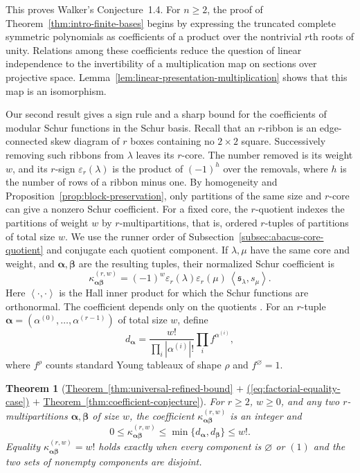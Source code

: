 \documentclass[12pt,reqno,a4paper]{amsart}
\numberwithin{equation}{section}
\numberwithin{figure}{section}
\theoremstyle{plain}
\newtheorem{mainthm}{Theorem}
\theoremstyle{definition}
\newcommand{\eps}{\varepsilon}
\newcommand{\inner}[2]{\left\langle #1,#2\right\rangle}
\begin{document}
This proves Walker's Conjecture~1.4.  For $n\geq2$, the proof of
Theorem~\ref{thm:intro-finite-bases} begins by expressing the truncated
complete symmetric polynomials as coefficients of a product over the
nontrivial $r$th roots of unity.
Relations among these coefficients reduce the question of linear independence to the
invertibility of a multiplication map on sections over projective space.
Lemma~\ref{lem:linear-presentation-multiplication} shows that this
map is an isomorphism.

Our second result gives a sign rule and a sharp bound for the
coefficients of modular Schur functions in the Schur basis.
Recall that an $r$-ribbon is an
edge-connected skew diagram of $r$ boxes containing no $2\times2$
square.  Successively removing such ribbons from $\lambda$ leaves its
$r$-core.  The number removed is its weight $w$, and its $r$-sign
$\eps_r(\lambda)$ is the product of $(-1)^{h}$ over the removals,
where $h$ is the number of rows of a ribbon minus one.
By homogeneity and Proposition~\ref{prop:block-preservation}, only
partitions of the same size and $r$-core can give a nonzero Schur
coefficient.  For a fixed core, the $r$-quotient indexes the partitions
of weight $w$ by $r$-multipartitions, that is, ordered $r$-tuples
of partitions of total size $w$.  We use the runner order
of Subsection~\ref{subsec:abacus-core-quotient} and conjugate each
quotient component.  If $\lambda,\mu$ have the same core and
weight, and $\boldsymbol\alpha,\boldsymbol\beta$ are the resulting
tuples, their normalized Schur coefficient is
\begin{equation}\label{eq:refaudit-intro-coefficients}
 \kappa^{(r,w)}_{\boldsymbol\alpha\boldsymbol\beta}
 =(-1)^w\eps_r(\lambda)\eps_r(\mu)\,
    \inner{\mathfrak s_\lambda}{s_\mu}.
\end{equation}
Here $\inner{\cdot}{\cdot}$ is the Hall inner product for which the
Schur functions are orthonormal.  The coefficient depends only on the
quotients \cite[Corollary~2.10]{Walker}.  For an $r$-tuple
$\boldsymbol\alpha=(\alpha^{(0)},\ldots,\alpha^{(r-1)})$ of total
size $w$, define
\[
 d_{\boldsymbol\alpha}
 =\frac{w!}{\prod_i|\alpha^{(i)}|!}\prod_i f^{\alpha^{(i)}},
\]
where $f^\rho$ counts standard Young tableaux of shape $\rho$ and
$f^\varnothing=1$.

\begin{mainthm}[{\hyperref[thm:universal-refined-bound]{Theorem~\ref*{thm:universal-refined-bound}}
  $+$ \hyperref[eq:factorial-equality-case]{(\ref*{eq:factorial-equality-case})}
  $+$ \hyperref[thm:coefficient-conjecture]{Theorem~\ref*{thm:coefficient-conjecture}}}]
\label{thm:intro-universal-matrices}
For $r\geq2$, $w\geq0$, and any two $r$-multipartitions
$\boldsymbol\alpha,\boldsymbol\beta$ of size $w$, the coefficient
$\kappa^{(r,w)}_{\boldsymbol\alpha\boldsymbol\beta}$ is an integer and
\[
 0\leq\kappa^{(r,w)}_{\boldsymbol\alpha\boldsymbol\beta}
 \leq\min\{d_{\boldsymbol\alpha},d_{\boldsymbol\beta}\}\leq w!.
\]
Equality $\kappa^{(r,w)}_{\boldsymbol\alpha\boldsymbol\beta}=w!$
holds exactly when every component is $\varnothing$ or $(1)$ and
the two sets of nonempty components are disjoint.
\end{mainthm}
\end{document}
